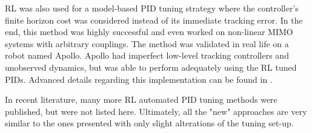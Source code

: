 RL was also used for a model-based PID tuning strategy where the controller's finite horizon cost was considered instead of its immediate tracking error. In the end, this method was highly successful and even worked on non-linear MIMO systems with arbitrary couplings. The method was validated in real life on a robot named Apollo.  Apollo had imperfect low-level tracking controllers and unobserved dynamics, but was able to perform adequately using the RL tuned PIDs. Advanced details regarding this implementation can be found in \cite{pid7}.

In recent literature, many more RL automated PID tuning methods were published, but were not listed here. Ultimately, all the "new" approaches are very similar to the ones presented with only slight alterations of the tuning set-up.















